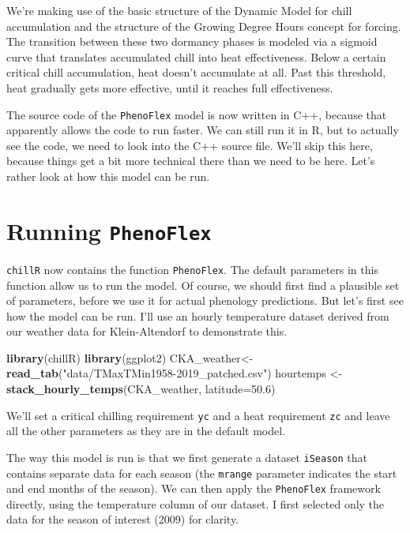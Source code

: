 \documentclass[
]{book}
\newenvironment{Shaded}{\begin{snugshade}}{\end{snugshade}}
\newcommand{\DataTypeTok}[1]{\textcolor[rgb]{0.13,0.29,0.53}{#1}}
\newcommand{\FloatTok}[1]{\textcolor[rgb]{0.00,0.00,0.81}{#1}}
\newcommand{\KeywordTok}[1]{\textcolor[rgb]{0.13,0.29,0.53}{\textbf{#1}}}
\newcommand{\NormalTok}[1]{#1}
\newcommand{\StringTok}[1]{\textcolor[rgb]{0.31,0.60,0.02}{#1}}
\begin{document}
We're making use of the basic structure of the Dynamic Model for chill accumulation and the structure of the Growing Degree Hours concept for forcing. The transition between these two dormancy phases is modeled via a sigmoid curve that translates accumulated chill into heat effectiveness. Below a certain critical chill accumulation, heat doesn't accumulate at all. Past this threshold, heat gradually gets more effective, until it reaches full effectiveness.

The source code of the \texttt{PhenoFlex} model is now written in C++, because that apparently allows the code to run faster. We can still run it in R, but to actually see the code, we need to look into the C++ source file. We'll skip this here, because things get a bit more technical there than we need to be here. Let's rather look at how this model can be run.

\hypertarget{running-phenoflex}{%
\section{\texorpdfstring{Running \texttt{PhenoFlex}}{Running PhenoFlex}}\label{running-phenoflex}}

\texttt{chillR} now contains the function \texttt{PhenoFlex}. The default parameters in this function allow us to run the model. Of course, we should first find a plausible set of parameters, before we use it for actual phenology predictions. But let's first see how the model can be run. I'll use an hourly temperature dataset derived from our weather data for Klein-Altendorf to demonstrate this.

\begin{Shaded}
\begin{Highlighting}[]
\KeywordTok{library}\NormalTok{(chillR)}
\KeywordTok{library}\NormalTok{(ggplot2)}
\NormalTok{CKA_weather<-}\KeywordTok{read_tab}\NormalTok{(}\StringTok{"data/TMaxTMin1958-2019_patched.csv"}\NormalTok{)}
\NormalTok{hourtemps <-}\StringTok{ }\KeywordTok{stack_hourly_temps}\NormalTok{(CKA_weather, }\DataTypeTok{latitude=}\FloatTok{50.6}\NormalTok{)}
\end{Highlighting}
\end{Shaded}

We'll set a critical chilling requirement \texttt{yc} and a heat requirement \texttt{zc} and leave all the other parameters as they are in the default model.

The way this model is run is that we first generate a dataset \texttt{iSeason} that contains separate data for each season (the \texttt{mrange} parameter indicates the start and end months of the season). We can then apply the \texttt{PhenoFlex} framework directly, using the temperature column of our dataset. I first selected only the data for the season of interest (2009) for clarity.
\end{document}

